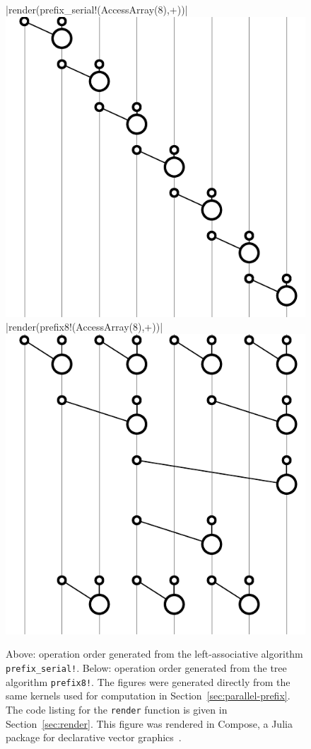 \documentclass{sig-alternate}
\newcommand{\code}[1]{\texttt{#1}}
\begin{document}
\begin{figure}
  \centering

  |render(prefix_serial!(AccessArray(8),+))|
  \includegraphics{serial}
  \vspace{12 pt}
  |render(prefix8!(AccessArray(8),+))|
  \includegraphics{tree}
  \caption{Above: operation order generated from the left-associative algorithm
	  \code{prefix\allowbreak\_serial!}.
	  Below: operation order generated from the tree algorithm \code{prefix8!}.
	  The figures were generated directly from the same kernels used for
	  computation in Section~\ref{sec:parallel-prefix}. The code listing
	  for the \code{render} function is given in Section~\ref{sec:render}.
	  This figure was rendered in Compose, a Julia package for declarative
          vector graphics~\cite{Compose.jl}.}
   \label{fig:gates}
\end{figure}
\end{document}
